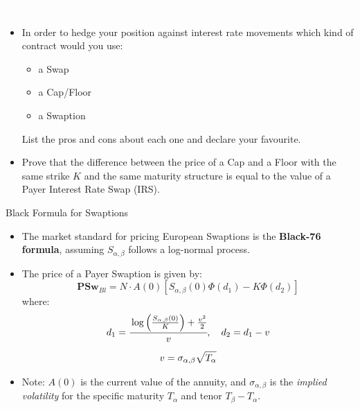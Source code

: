 \documentclass{beamer}
\begin{document}
\begin{homework}
\begin{frame}{\textcolor{white}{Homework}}
\begin{itemize}
	\item[white] In order to hedge your position against interest rate movements which kind of contract would you use:
	\begin{itemize}
		\item[white] a Swap
		\item[white] a Cap/Floor
		\item[white] a Swaption
	\end{itemize}
	List the pros and cons about each one and declare your favourite.
	\item[white] Prove that the difference between the price of a Cap and a Floor with the same strike $K$ and the same maturity structure is equal to the value of a Payer Interest Rate Swap (IRS).
\end{itemize}
\end{frame}
\end{homework}

\begin{frame}{Black Formula for Swaptions}
\begin{itemize}
\item The market standard for pricing European Swaptions is the \textbf{Black-76 formula}, assuming $S_{\alpha,\beta}$ follows a log-normal process.
\item The price of a Payer Swaption is given by:
\begin{equation}
	\boxed{\textbf{PSw}_{Bl} = N \cdot A(0) \left[ S_{\alpha,\beta}(0)\Phi(d_1) - K\Phi(d_2) \right]}
\end{equation}
where:
\begin{equation*}
	\begin{gathered}
		d_{1} = \cfrac{\log\left(\frac{S_{\alpha,\beta}(0)}{K}\right) + \frac{v^2}{2}}{v}, \quad d_2 = d_1 - v \\[0.2cm]
		v = \sigma_{\alpha,\beta}\sqrt{T_\alpha}
	\end{gathered}
\end{equation*}
\item Note: $A(0)$ is the current value of the annuity, and $\sigma_{\alpha,\beta}$ is the \emph{implied volatility} for the specific maturity $T_\alpha$ and tenor $T_\beta - T_\alpha$.
\end{itemize}
\end{frame}
\end{document}
